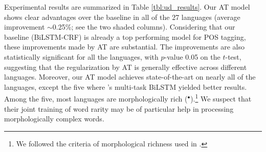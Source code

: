 \documentclass[11pt,a4paper]{article}
\begin{document}
Experimental results are summarized in Table \ref{tbl:ud_results}.
Our AT model shows clear advantages over the baseline in all of the 27 languages (average improvement $\sim$0.25\%; see the two shaded columns). 
Considering that our baseline (BiLSTM-CRF) is already a top performing model for POS tagging,
these improvements made by AT are substantial.
The improvements are also statistically significant for all the languages, with $p$-value \scalebox{0.9}{$<$} 0.05 on the $t$-test,
suggesting that the regularization by AT %
is generally effective across different languages.
Moreover, our AT model achieves state-of-the-art on nearly all of the languages, except the five where 
's multi-task BiLSTM yielded better results.
Among the five, most languages are morphologically rich ($^\bullet$).\footnote{We followed the criteria of morphological richness used in .} 
We suspect that their joint training of word rarity may be of particular help in processing morphologically complex words.
\end{document}

